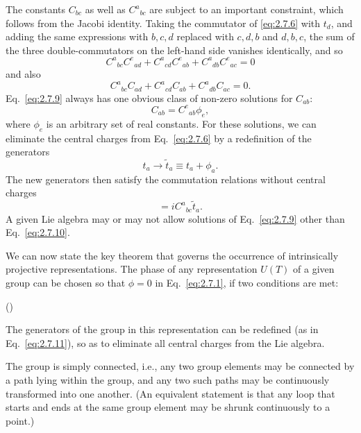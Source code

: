 The constants $C_{bc}$ as well as $C^a{}_{bc}$ are subject to an important
constraint, which follows from the Jacobi identity. Taking the commutator of
\eqref{eq:2.7.6} with $t_d$, and adding the same expressions with $b,c,d$ replaced with
$c,d,b$ and $d,b,c$, the sum of the three double-commutators on the left-hand
side vanishes identically, and so
\begin{equation}
  C^a{}_{bc}C^e{}_{ad}+C^a{}_{cd}C^e{}_{ab}
    +C^a{}_{db}C^e{}_{ac}=0
  \tag{2.7.8}\label{eq:2.7.8}
\end{equation}
and also
\begin{equation}
  C^a{}_{bc}C_{ad}+C^a{}_{cd}C_{ab}+C^a{}_{db}C_{ac}=0.
  \tag{2.7.9}\label{eq:2.7.9}
\end{equation}
Eq.~\eqref{eq:2.7.9} always has one obvious class of non-zero solutions for $C_{ab}$:
\begin{equation}
  C_{ab}=C^e{}_{ab}\phi_e,
  \tag{2.7.10}\label{eq:2.7.10}
\end{equation}
where $\phi_e$ is an arbitrary set of real constants. For these solutions, we
can eliminate the central charges from Eq.~\eqref{eq:2.7.6} by a redefinition of the
generators
\begin{equation}
  t_a\longrightarrow\widetilde t_a\equiv t_a+\phi_a.
  \tag{2.7.11}\label{eq:2.7.11}
\end{equation}
The new generators then satisfy the commutation relations without central
charges
\begin{equation}
  [\widetilde t_b,\widetilde t_c]
    =iC^a{}_{bc}\widetilde t_a.
  \tag{2.7.12}\label{eq:2.7.12}
\end{equation}
A given Lie algebra may or may not allow solutions of Eq.~\eqref{eq:2.7.9} other than
Eq.~\eqref{eq:2.7.10}.

We can now state the key theorem that governs the occurrence of intrinsically
projective representations. The phase of any representation $U(T)$ of a given
group can be chosen so that $\phi=0$ in Eq.~\eqref{eq:2.7.1}, if two conditions are met:

\begin{list}{()}{\setlength{\leftmargin}{2.3em}}
\item The generators of the group in this representation can be redefined (as
in Eq.~\eqref{eq:2.7.11}), so as to eliminate all central charges from the Lie algebra.

\item The group is simply connected, i.e., any two group elements may be
connected by a path lying within the group, and any two such paths may be
continuously transformed into one another. (An equivalent statement is that
any loop that starts and ends at the same group element may be shrunk
continuously to a point.)
\end{list}

